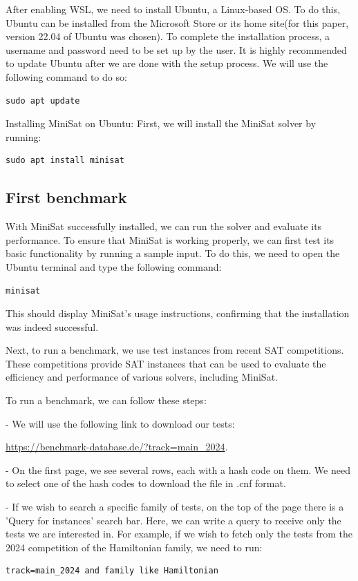\documentclass[runningheads]{llncs}
\begin{document}
After enabling \ac{WSL}, we need to install Ubuntu, a Linux-based \ac{OS}. To do this, Ubuntu can be installed from the Microsoft Store or its home site(for this paper, version 22.04 of Ubuntu was chosen). To complete the installation process, a username and password need to be set up by the user. It is highly recommended to update Ubuntu after we are done with the setup process. We will use the following command to do so: \begin{verbatim}sudo apt update\end{verbatim}

Installing MiniSat on Ubuntu: First, we will install the MiniSat solver by running: \begin{verbatim}sudo apt install minisat\end{verbatim}

\subsection{First benchmark}\label{First benchmark}
With MiniSat successfully installed, we can run the solver and evaluate its performance. To ensure that MiniSat is working properly, we can first test its basic functionality by running a sample input. To do this, we need to open the Ubuntu terminal and type the following command: \begin{verbatim}minisat\end{verbatim} This should display MiniSat’s usage instructions, confirming that the installation was indeed successful.

Next, to run a benchmark, we use test instances from recent SAT competitions. These competitions provide SAT instances that can be used to evaluate the efficiency and performance of various solvers, including MiniSat.

To run a benchmark, we can follow these steps:

- We will use the following link to download our tests: 

\url{https://benchmark-database.de/?track=main_2024}. 

- On the first page, we see several rows, each with a hash code on them. We need to select one of the hash codes to download the file in .cnf format.

- If we wish to search a specific family of tests, on the top of the page there is a 'Query for instances' search bar. Here, we can write a query to receive only the tests we are interested in. For example, if we wish to fetch only the tests from the 2024 competition of the Hamiltonian family, we need to run: 
\begin{verbatim}track=main_2024 and family like Hamiltonian\end{verbatim}
\end{document}
